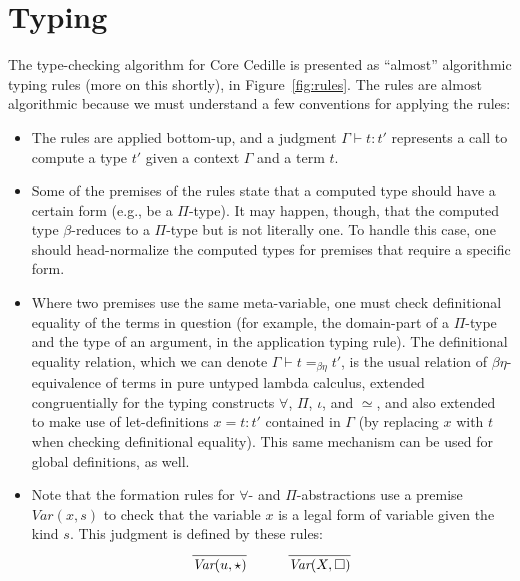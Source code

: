 \documentclass{article}
\begin{document}
\section{Typing}

The type-checking algorithm for Core Cedille is presented as ``almost'' algorithmic typing rules (more on this shortly),
in Figure~\ref{fig:rules}.  The rules are almost algorithmic because we must understand a few conventions for applying the rules:

\begin{itemize}
\item The rules are applied bottom-up, and a judgment $\Gamma\vdash t : t'$ represents a call to compute
  a type $t'$ given a context $\Gamma$ and a term $t$.
\item Some of the premises of the rules state that a computed type should have a certain form (e.g., be a $\Pi$-type).  It may happen, though, that the computed type $\beta$-reduces to a $\Pi$-type but is not literally one.  To handle this case, one should head-normalize the computed types for premises that require a specific form.
\item Where two premises use the same meta-variable, one must check definitional equality of the terms in question (for example, the domain-part of a $\Pi$-type and the type of an argument, in the application typing rule).
  The definitional equality relation, which we can denote $\Gamma \vdash t =_{\beta\eta} t'$,
  is the usual relation of $\beta\eta$-equivalence of
terms in pure untyped lambda calculus, extended congruentially for the
typing constructs $\forall$, $\Pi$, $\iota$, and $\simeq$, and also
extended to make use of let-definitions $x = t : t'$ contained in
$\Gamma$ (by replacing $x$ with $t$ when checking definitional
equality).  This same mechanism can be used for global definitions, as
well.
\item Note that the formation rules for $\forall$- and $\Pi$-abstractions use
  a premise $\textit{Var}(x,s)$ to check
  that the variable $x$ is a legal form of variable given the kind $s$.  This
  judgment is defined by these rules:
  \[
  \begin{array}{lll}
    \infer{\textit{Var}(u,\star)}{\ } & \ \ \ & \infer{\textit{Var}(X,\Box)}{\ }
  \end{array}
  \]
  
\end{itemize}
\end{document}
